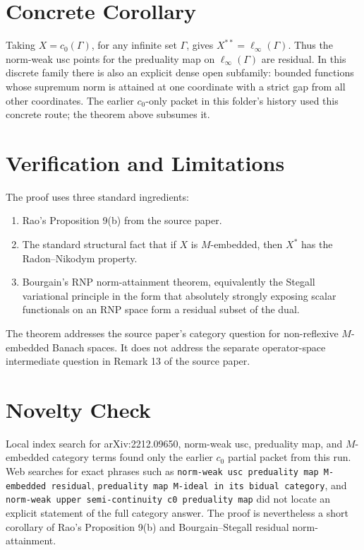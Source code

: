 \documentclass[11pt]{article}
\begin{document}
\section*{Concrete Corollary}

Taking \(X=c_0(\Gamma)\), for any infinite set \(\Gamma\), gives
\(X^{**}=\ell_\infty(\Gamma)\). Thus the norm-weak usc points for the
preduality map on \(\ell_\infty(\Gamma)\) are residual. In this discrete
family there is also an explicit dense open subfamily: bounded functions whose
supremum norm is attained at one coordinate with a strict gap from all other
coordinates. The earlier \(c_0\)-only packet in this folder's history used this
concrete route; the theorem above subsumes it.

\section*{Verification and Limitations}

The proof uses three standard ingredients:

\begin{enumerate}
\item Rao's Proposition 9(b) from the source paper.
\item The standard structural fact that if \(X\) is \(M\)-embedded, then
      \(X^*\) has the Radon--Nikodym property.
\item Bourgain's RNP norm-attainment theorem, equivalently the Stegall
      variational principle in the form that absolutely strongly exposing
      scalar functionals on an RNP space form a residual subset of the dual.
\end{enumerate}

The theorem addresses the source paper's category question for non-reflexive
\(M\)-embedded Banach spaces. It does not address the separate operator-space
intermediate question in Remark 13 of the source paper.

\section*{Novelty Check}

Local index search for arXiv:2212.09650, norm-weak usc, preduality map, and
\(M\)-embedded category terms found only the earlier \(c_0\) partial packet
from this run. Web searches for exact phrases such as
\texttt{norm-weak usc preduality map M-embedded residual},
\texttt{preduality map M-ideal in its bidual category}, and
\texttt{norm-weak upper semi-continuity c0 preduality map} did not locate an
explicit statement of the full category answer. The proof is nevertheless a
short corollary of Rao's Proposition 9(b) and Bourgain--Stegall residual
norm-attainment.
\end{document}

